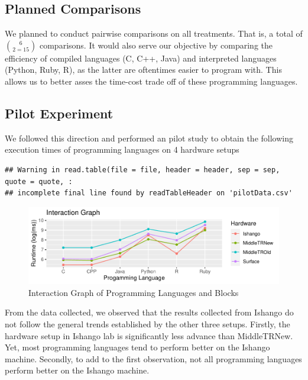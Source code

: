 \documentclass[12pt,halfline,a4paper,]{ouparticle}
\begin{document}
\hypertarget{planned-comparisons}{%
\subsection{Planned Comparisons}\label{planned-comparisons}}

We planned to conduct pairwise comparisons on all treatments. That is, a
total of \(6 \choose 2 = 15\) comparisons. It would also serve our
objective by comparing the efficiency of compiled languages (C, C++,
Java) and interpreted languages (Python, Ruby, R), as the latter are
oftentimes easier to program with. This allows us to better asses the
time-cost trade off of these programming languages.

\hypertarget{pilot-experiment}{%
\subsection{Pilot Experiment}\label{pilot-experiment}}

We followed this direction and performed an pilot study to obtain the
following execution times of programming languages on 4 hardware setups

\begin{verbatim}
## Warning in read.table(file = file, header = header, sep = sep, quote = quote, :
## incomplete final line found by readTableHeader on 'pilotData.csv'
\end{verbatim}

\begin{figure}[H]
\includegraphics[width=1\linewidth]{skeleton_files/figure-latex/figPilot-1} \caption{Interaction Graph of Programming Languages and Blocks}\label{fig:figPilot}
\end{figure}

From the data collected, we observed that the results collected from
Ishango do not follow the general trends established by the other three
setups. Firstly, the hardware setup in Ishango lab is significantly less
advance than MiddleTRNew. Yet, most programming languages tend to
perform better on the Ishango machine. Secondly, to add to the first
observation, not all programming languages perform better on the Ishango
machine.
\end{document}
